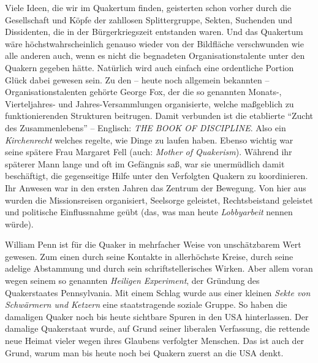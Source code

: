 Viele Ideen, die wir im Quakertum finden, geisterten schon vorher durch die
Gesellschaft und Köpfe der zahllosen Splittergruppe, Sekten, Suchenden und
Dissidenten, die in der Bürgerkriegszeit entstanden waren. Und das Quakertum
wäre höchstwahrscheinlich genauso wieder von der Bildfläche verschwunden wie
alle anderen auch, wenn es nicht die begnadeten Organisationstalente unter den
Quakern gegeben hätte. Natürlich wird auch einfach eine ordentliche Portion
Glück
dabei gewesen sein. Zu den -- heute noch allgemein bekannten --
Organisationstalenten gehörte George Fox, der die so genannten
Monats-, Vierteljahres- und Jahres-Versammlungen
organisierte, welche maßgeblich zu
funktionierenden
Strukturen beitrugen. Damit verbunden ist die etablierte "`Zucht des
Zusammenlebens"' -- Englisch: \textit{THE BOOK OF DISCIPLINE}. Also ein
\textit{Kirchenrecht} welches
regelte, wie Dinge zu laufen haben. Ebenso wichtig war seine spätere Frau
Margaret Fell (auch: \textit{Mother of
Quakerism}). Während ihr späterer Mann
lange und oft im Gefängnis saß, war sie unermüdlich damit beschäftigt, die
gegenseitige Hilfe unter den Verfolgten Quakern zu
koordinieren. Ihr Anwesen
war in den ersten Jahren das Zentrum der Bewegung. Von hier aus wurden die
Missionsreisen organisiert, Seelsorge geleistet,
Rechtsbeistand geleistet und
politische Einflussnahme geübt (das, was man heute
\textit{Lobbyarbeit} nennen
würde).

\medskip

William Penn ist für die Quaker in mehrfacher Weise von unschätzbarem Wert
gewesen.
Zum einen durch seine Kontakte in allerhöchste Kreise, durch seine adelige
Abstammung
und
durch sein schriftstellerisches Wirken. Aber allem voran wegen seinem so
genannten \textit{Heiligen Experiment}, der
Gründung des Quakerstaates
Pennsylvania. Mit einem Schlag wurde aus einer kleinen \textit{Sekte von
Schwärmern und Ketzern} eine staatstragende soziale Gruppe. So haben die
damaligen Quaker noch bis heute sichtbare Spuren in den USA
hinterlassen.
Der damalige Quakerstaat wurde, auf Grund seiner liberalen Verfassung, die
rettende neue Heimat vieler wegen ihres Glaubens verfolgter Menschen. Das ist
auch der Grund, warum man bis heute noch bei Quakern zuerst an die USA denkt.

